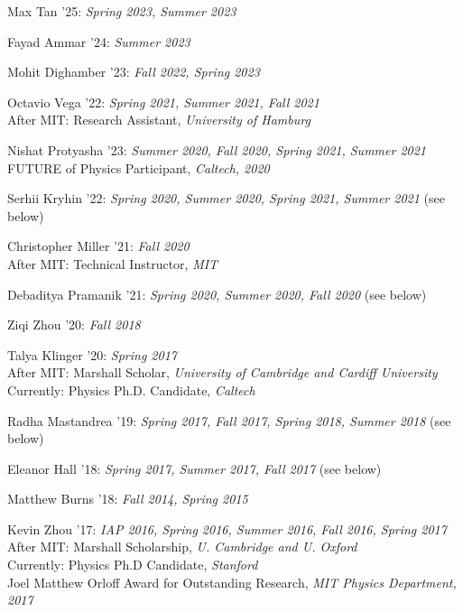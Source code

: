 \bbl

\item Max Tan '25: \emph{Spring 2023, Summer 2023}

\item Fayad Ammar '24: \emph{Summer 2023}

\item Mohit Dighamber '23: \emph{Fall 2022, Spring 2023}

\item Octavio Vega '22: \emph{Spring 2021, Summer 2021, Fall 2021}
\\ After MIT: Research Assistant, \emph{University of Hamburg}

\item Nishat Protyasha '23: \emph{Summer 2020, Fall 2020, Spring 2021, Summer 2021}
\\ FUTURE of Physics Participant, \emph{Caltech, 2020}

\item Serhii Kryhin '22: \emph{Spring 2020, Summer 2020, Spring 2021, Summer 2021} (see below) 

\item Christopher Miller '21: \emph{Fall 2020}
\\ After MIT: Technical Instructor, \emph{MIT}

\item Debaditya Pramanik '21: \emph{Spring 2020, Summer 2020, Fall 2020} (see below) 

\item Ziqi Zhou '20: \emph{Fall 2018}

\item Talya Klinger '20: \emph{Spring 2017}
\\ After MIT: Marshall Scholar, \emph{University of Cambridge and Cardiff University}
\\ Currently: Physics Ph.D. Candidate, \emph{Caltech}

\item Radha Mastandrea '19: \emph{Spring 2017, Fall 2017, Spring 2018, Summer 2018} (see below) 

\item Eleanor Hall '18: \emph{Spring 2017, Summer 2017, Fall 2017} (see below) 

\item Matthew Burns '18: \emph{Fall 2014, Spring 2015}

\item Kevin Zhou '17: \emph{IAP 2016, Spring 2016, Summer 2016, Fall 2016, Spring 2017}
\\ After MIT: Marshall Scholarship, \emph{U. Cambridge and U. Oxford}
\\ Currently: Physics Ph.D Candidate, \emph{Stanford}
\\ Joel Matthew Orloff Award for Outstanding Research, \emph{MIT Physics Department, 2017}

